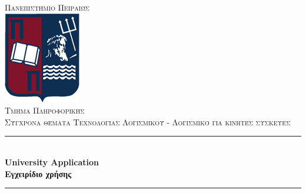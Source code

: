 \documentclass[12pt]{article}
\begin{document}
	
	\begin{titlepage}
		
		\newcommand{\HRule}{\rule{\linewidth}{0.5mm}} %
		
		\center %
		
		
		\textsc{\LARGE Πανεπιστήμιο Πειραιώς}\\[1.5cm] %
		\includegraphics[scale=0.6]{UNIPI_(logo).png}\\[1cm] %
		\textsc{\Large Τμήμα Πληροφορικής}\\[0.5cm] %
		\textsc{\large Σύγχρονα θέματα Τεχνολογίας Λογισμικού - Λογισμικό για κινητές συσκευές}\\[0.5cm] %
		
		
		\HRule \\[0.4cm]
		{ \Large \bfseries University Application}\\[0.4cm] %
		{ \Large \bfseries Εγχειρίδιο χρήσης}\\[0.4cm] %
		\HRule \\[1.5cm]
		
		
		
		
		
		
		\vfill %
		
	\end{titlepage}
	
\end{document}
